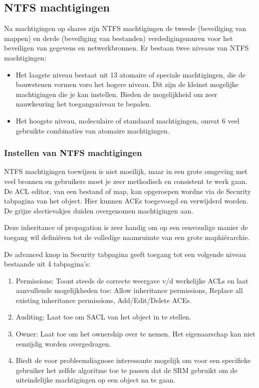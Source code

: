 \subsection{NTFS machtigingen}

Na machtigingen op shares zijn NTFS machtigingen de tweede (beveiliging van
mappen) en derde (beveiliging van bestanden) verdedigingsmuren voor het
beveiligen van gegevens en netwerkbronnen. Er bestaan twee niveaus van NTFS
machtigingen:
\begin{itemize}
	\item Het laagste niveau bestaat uit 13 atomaire of speciale
		machtigingen, die de bouwstenen vormen voro het hogere niveau.
		Dit zijn de kleinst mogelijke machtigingen die je kan instellen.
		Bieden de mogelijkheid om zeer nauwkeuring het toegangsniveau te
		bepalen.
	\item Het hoogste niveau, moleculaire of standaard machtigingen, omvat 6
		veel gebruikte combinaties van atomaire machtigingen.
\end{itemize}

\subsubsection{Instellen van NTFS machtigingen}

NTFS machtigingen toewijzen is niet moeilijk, maar in een grote omgeving met
veel bronnen en gebruikers moet je zeer methodisch en consistent te werk gaan.
De ACL editor, van een bestand of map, kan opgeroepen wordne via de Security
tabpagina van het object. Hier kunnen ACEs toegevoegd en verwijderd worden. De
grijze slectievakjes duiden overgenomen machtigingen aan.

Deze inheritance of propagation is zeer handig om op een eenvoudige manier de
toegang wil definiëren tot de volledige naamruimte van een grote maphiërarchie.

De advanced knop in Security tabpagina geeft toegang tot een volgende niveau
bestaande uit 4 tabpagina's:
\begin{enumerate}
	\item Permissions: Toont steeds de correcte weergave v/d werkelijke
		ACLs en laat aanvullende mogelijkheden toe: Allow inheritance
		permissions, Replace all existing inheritance permissions,
		Add/Edit/Delete ACEs.
	\item Auditing: Laat toe om SACL van het object in te stellen.
	\item Owner: Laat toe om het ownership over te nemen. Het eigenaarschap
		kan niet eenzijdig worden overgedragen.
	\item Biedt de voor probleemdiagnose interessante mogelijk om voor een
		specifieke gebruiker het zelfde algoritme toe te passen dat de
		SRM gebruikt om de uiteindelijke machtigingen op een object na
		te gaan.
\end{enumerate}


